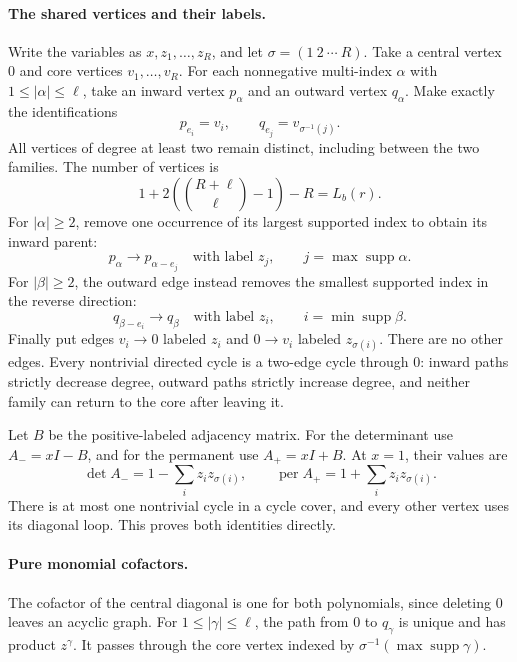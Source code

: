 \paragraph{The shared vertices and their labels.}
Write the variables as \(x,z_1,\ldots,z_R\), and let
\(\sigma=(1\ 2\ \cdots\ R)\). Take a central vertex
\(0\) and core vertices \(v_1,\ldots,v_R\).
For each nonnegative multi-index \(\alpha\) with
\(1\leq|\alpha|\leq\ell\), take an inward vertex
\(p_\alpha\) and an outward vertex \(q_\alpha\).
Make exactly the identifications
\[
                  p_{e_i}=v_i,\qquad
                  q_{e_j}=v_{\sigma^{-1}(j)}.
                                                               \tag{F-022.3}
\]
All vertices of degree at least two remain distinct, including
between the two families. The number of vertices is
\[
 1+2\left(\binom{R+\ell}{\ell}-1\right)-R=L_b(r).
\]
For \(|\alpha|\geq2\), remove one occurrence of its
largest supported index to obtain its inward parent:
\[
                 p_\alpha\longrightarrow p_{\alpha-e_j}
                    \quad\text{with label }z_j,
                    \qquad j=\max\operatorname{supp}\alpha.
\]
For \(|\beta|\geq2\), the outward edge instead removes
the smallest supported index in the reverse direction:
\[
                 q_{\beta-e_i}\longrightarrow q_\beta
                    \quad\text{with label }z_i,
                    \qquad i=\min\operatorname{supp}\beta.
\]
Finally put edges
\(v_i\longrightarrow0\) labeled \(z_i\) and
\(0\longrightarrow v_i\) labeled \(z_{\sigma(i)}\).
There are no other edges. Every nontrivial directed cycle
is a two-edge cycle through \(0\): inward paths strictly
decrease degree, outward paths strictly increase degree,
and neither family can return to the core after leaving it.

Let \(B\) be the positive-labeled adjacency matrix.
For the determinant use \(A_-=xI-B\), and for the
permanent use \(A_+=xI+B\). At \(x=1\), their values are
\[
 \det A_-=1-\sum_i z_i z_{\sigma(i)},\qquad
 \operatorname{per}A_+=1+\sum_i z_i z_{\sigma(i)}.
                                                               \tag{F-022.4}
\]
There is at most one nontrivial cycle in a cycle cover,
and every other vertex uses its diagonal loop. This proves
both identities directly.

\paragraph{Pure monomial cofactors.}
The cofactor of the central diagonal is one for both
polynomials, since deleting \(0\) leaves an acyclic graph.
For \(1\leq|\gamma|\leq\ell\), the path from \(0\)
to \(q_\gamma\) is unique and has product \(z^\gamma\).
It passes through the core vertex indexed by
\(\sigma^{-1}(\max\operatorname{supp}\gamma)\).

